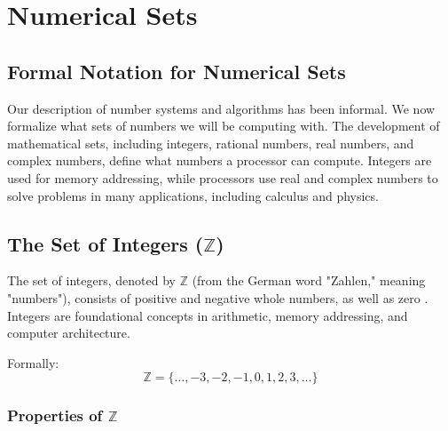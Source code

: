 \chapter{Numerical Sets}
\localtoc
\section{Formal Notation for Numerical Sets}
Our description of number systems and algorithms has been informal. We now formalize what sets of numbers we will be computing with. The development of mathematical sets, including integers, rational numbers, real numbers, and complex numbers, define what numbers a processor can compute. Integers are used for memory addressing, while processors use real and complex numbers to solve problems in many applications, including calculus and physics. 

\section{The Set of Integers (\( \mathbb{Z} \))}
The set of integers, denoted by \( \mathbb{Z} \) (from the German word "Zahlen," meaning "numbers"), consists of positive and negative whole numbers, as well as zero \cite{knuth1997}. Integers are foundational concepts in arithmetic, memory addressing, and computer architecture.

Formally:
\[
\mathbb{Z} = \{\dots, -3, -2, -1, 0, 1, 2, 3, \dots\}
\]

\subsection{Properties of $\mathbb{Z}$}

